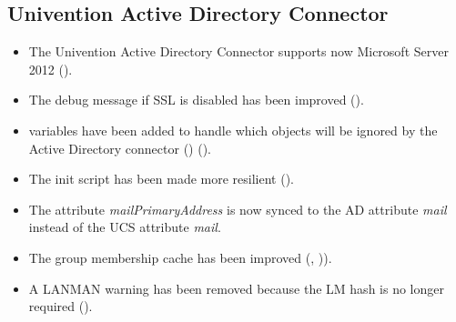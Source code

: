 \subsection{Univention Active Directory Connector}
\begin{itemize}
\item The Univention Active Directory Connector supports now Microsoft
  Server 2012 ().
\item The debug message if SSL is disabled has been improved
  ().
\item \ucsUCR{} variables have been added to handle which objects will
  be ignored by the Active Directory connector
  () ().
\item The init script has been made more resilient ().
\item The attribute \emph{mailPrimaryAddress} is now synced to the
  AD attribute \emph{mail} instead of the UCS attribute \emph{mail}.
\item The group membership cache has been improved (,
  )).
\item A LANMAN warning has been removed because the LM hash is no
  longer required ().
\end{itemize}



